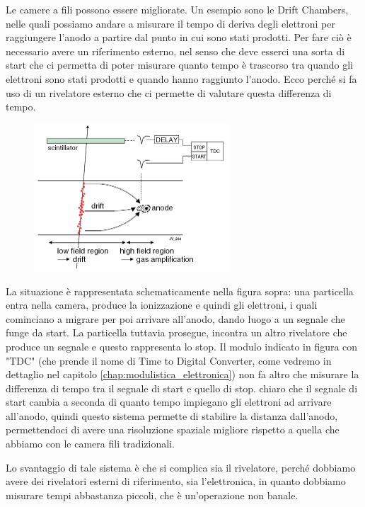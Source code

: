 Le camere a fili possono essere migliorate. Un esempio sono le Drift Chambers, nelle quali possiamo andare a misurare il tempo di deriva degli elettroni per raggiungere l'anodo a partire dal punto in cui sono stati prodotti. Per fare ciò è necessario avere un riferimento esterno, nel senso che deve esserci una sorta di start che ci permetta di poter misurare quanto tempo è trascorso tra quando gli elettroni sono stati prodotti e quando hanno raggiunto l'anodo. Ecco perché si fa uso di un rivelatore esterno che ci permette di valutare questa differenza di tempo.
\begin{figure}[H]
   \centering
   \includegraphics[width=0.65\textwidth]{immagini/drift_chambers.png}
\end{figure}
La situazione è rappresentata schematicamente nella figura sopra: una particella entra nella camera, produce la ionizzazione e quindi gli elettroni, i quali cominciano a migrare per poi arrivare all'anodo, dando luogo a un segnale che funge da start. La particella tuttavia prosegue, incontra un altro rivelatore che produce un segnale e questo rappresenta lo stop. Il modulo indicato in figura con "TDC" (che prende il nome di Time to Digital Converter, come vedremo in dettaglio nel capitolo \ref{chap:modulistica_elettronica}) non fa altro che misurare la differenza di tempo tra il segnale di start e quello di stop. \E chiaro che il segnale di start cambia a seconda di quanto tempo impiegano gli elettroni ad arrivare all'anodo, quindi questo sistema permette di stabilire la distanza dall'anodo, permettendoci di avere una risoluzione spaziale migliore rispetto a quella che abbiamo con le camera fili tradizionali.

Lo svantaggio di tale sistema è che si complica sia il rivelatore, perché dobbiamo avere dei rivelatori esterni di riferimento, sia l'elettronica, in quanto dobbiamo misurare tempi abbastanza piccoli, che è un'operazione non banale.

